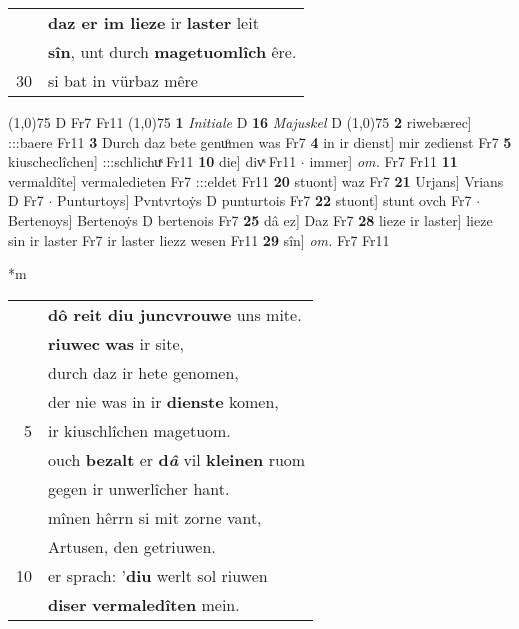 \documentclass[8pt,a4paper,notitlepage]{article}
\begin{document}
\begin{table}[ht]
\begin{minipage}[t]{0.5\linewidth}
\begin{tabular}{rl}
 & \textbf{daz er im lieze} ir \textbf{laster} leit\\ 
 & \textbf{sîn}, unt durch \textbf{magetuomlîch} êre.\\ 
30 & si bat in vürbaz mêre\\ 
\end{tabular}
\scriptsize
\line(1,0){75} \newline
D Fr7 Fr11 \newline
\line(1,0){75} \newline
\textbf{1} \textit{Initiale} D  \textbf{16} \textit{Majuskel} D  \newline
\line(1,0){75} \newline
\textbf{2} riwebærec] :::baere Fr11 \textbf{3} Durch daz bete genuͦmen was Fr7 \textbf{4} in ir dienst] mir zedienst Fr7 \textbf{5} kiuscheclîchen] :::schlichuͯ Fr11 \textbf{10} die] divͯ Fr11  $\cdot$ immer] \textit{om.} Fr7 Fr11 \textbf{11} vermaldîte] vermaledieten Fr7 :::eldet Fr11 \textbf{20} stuont] waz Fr7 \textbf{21} Urjans] Vrians D Fr7  $\cdot$ Punturtoys] Pvntvrtoẏs D punturtois Fr7 \textbf{22} stuont] stunt ovch Fr7  $\cdot$ Bertenoys] Bertenoẏs D bertenois Fr7 \textbf{25} dâ ez] Daz Fr7 \textbf{28} lieze ir laster] lieze sin ir laster Fr7 ir laster liezz wesen Fr11 \textbf{29} sîn] \textit{om.} Fr7 Fr11 \newline
\end{minipage}
\hspace{0.5cm}
\begin{minipage}[t]{0.5\linewidth}
\small
\begin{center}*m
\end{center}
\begin{tabular}{rl}
 & \textbf{dô reit diu juncvrouwe} uns mite.\\ 
 & \textbf{riuwec} \textbf{was} ir site,\\ 
 & durch daz ir hete genomen,\\ 
 & der nie was in ir \textbf{dienste} komen,\\ 
5 & ir kiuschlîchen magetuom.\\ 
 & ouch \textbf{bezalt} er \textbf{d\textit{â}} vil \textbf{kleinen} ruom\\ 
 & gegen ir unwerlîcher hant.\\ 
 & mînen hêrrn si mit zorne vant,\\ 
 & Artusen, den getriuwen.\\ 
10 & er sprach: '\textbf{diu} werlt sol riuwen\\ 
 & \textbf{diser} \textbf{vermaledîten} mein.\\ 

\end{tabular}
\end{minipage}
\end{table}
\end{document}
